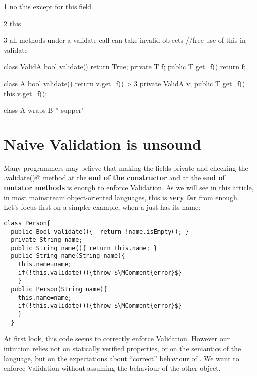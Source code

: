 1 no this except for this.field

2 this 

3 all methods under a validate call can take invalid objects //free use of this in validate

class ValidA {
		bool validate() { return True; }
		private T f;
		public T get_f() { return f; }
}

class A {
		bool validate() {
			return v.get_f() > 3
		}
		private ValidA v;
		public T get_f() { this.v.get_f(); }
}

class A wraps B {
	'' supper' 
}




\saveSpace







\saveSpace
\section{Naive Validation is unsound}
\saveSpace\saveSpace
Many programmers may believe that making the fields private and checking the \Q@.validate()@ method
at the \textbf{end of the constructor} and at the \textbf{end of mutator methods} is enough to enforce
Validation.
As we will see in this article, in most mainstream object-oriented languages, this is \textbf{very far} from enough.
Let's focus first on a simpler example, when a \Q@Person@ just has its name:
\begin{lstlisting}
class Person{
  public Bool validate(){  return !name.isEmpty(); }
  private String name;
  public String name(){ return this.name; }
  public String name(String name){
    this.name=name;
    if(!this.validate()){throw $\MComment{error}$}
    }
  public Person(String name){
    this.name=name;
    if(!this.validate()){throw $\MComment{error}$}
    }
  }
\end{lstlisting}
\noindent At first look, this code seems to correctly enforce Validation.
However our intuition relies not on statically verified properties, or on the semantics of the language,
but on the expectations about ``correct'' behaviour of \Q@String@.
We want to enforce Validation without assuming the behaviour of the other object.

